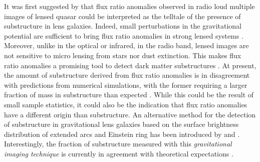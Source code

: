 \documentclass[useAMS,usenatbib]{mn2e}
\begin{document}
It was first suggested by \citet{Mao1998} that flux ratio anomalies observed in radio loud multiple images of lensed quasar could be interpreted as the telltale of the presence of substructure in lens galaxies.
Indeed, small perturbations in the gravitational potential are
sufficient to bring flux ratio anomalies in strong lensed systems \citep{Bradac02}. 
Moreover, unlike in the optical or infrared, in the radio band, lensed
images are not sensitive to micro lensing from stars nor dust
extinction.  This makes flux ratio anomalies a promising tool to
detect dark matter substructures \citep{Dalal2002, N13}.  At present,
the amount of substructure derived from flux ratio anomalies is in
disagreement with predictions from numerical simulations, with the
former requiring a larger fraction of mass in substructure than
expected \citet{Xu14}. While this could be the result of small sample
statistics, it could also be the indication that flux ratio anomalies
have a different origin than substructure. 
%
An alternative method for
the detection of substructure in gravitational lens galaxies based on
the surface brightness distribution of extended arcs and Einstein ring
has been introduced by \citet{K05} and \citet{V09}. Interestingly, the fraction of
substructure measured with this \emph{gravitational imaging technique}
is currently in agreement with theoretical expectations \citep{V14a}.
\end{document}
